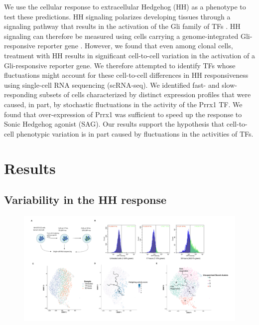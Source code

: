 We use the cellular response to extracellular Hedgehog (HH) as a phenotype to test these predictions. HH signaling polarizes developing tissues through a signaling pathway that results in the activation of the Gli family of TFs \cite{Kong2019-wo,Briscoe2013-ze,Lee2016-bf}. HH signaling can therefore be measured using cells carrying a genome-integrated Gli-responsive reporter gene \cite{Pusapati2018-gs}. However, we found that even among clonal cells, treatment with HH results in significant cell-to-cell variation in the activation of a Gli-responsive reporter gene. We therefore attempted to identify TFs whose fluctuations might account for these cell-to-cell differences in HH responsiveness using single-cell RNA sequencing (scRNA-seq). We identified fast- and slow-responding subsets of cells characterized by distinct expression profiles that were caused, in part, by stochastic fluctuations in the activity of the Prrx1 TF.  We found that over-expression of Prrx1 was sufficient to speed up the response to Sonic Hedgehog agonist (SAG). Our results support the hypothesis that cell-to-cell phenotypic variation is in part caused by fluctuations in the activities of TFs.

\section{Results}

\subsection{Variability in the HH response}
\begin{figure}[t!]  
    \centering
    \includegraphics[width=\linewidth]{figures/hedgehog/hh_figure1.pdf}
    \caption[]{%
        \textbf{}
    }
    \label{fig:hh_figure1}
\end{figure}

